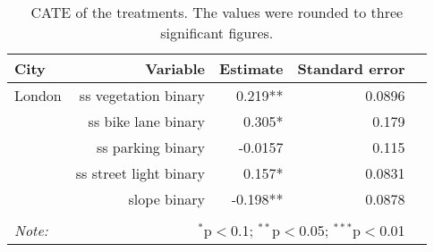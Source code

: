 \begin{table}[!htp]\centering
\caption{CATE of the treatments. The values were rounded to three significant figures.}\label{result:tab:cf}
\scriptsize
\begin{tabular}{lrrrr}\toprule
City&Variable&Estimate &Standard error \\ \midrule
London & ss vegetation binary & 0.219** & 0.0896 \\
 & ss bike lane binary & 0.305* & 0.179 \\
 & ss parking binary & -0.0157 & 0.115 \\
 & ss street light binary & 0.157* & 0.0831 \\
 & slope binary & -0.198** & 0.0878 \\
\hline
\hline \\[-1.8ex]
\textit{Note:}  & \multicolumn{3}{r}{$^{*}$p$<$0.1; $^{**}$p$<$0.05; $^{***}$p$<$0.01} \\
\end{tabular}
\end{table}
